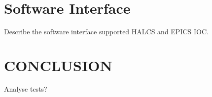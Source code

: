 \documentclass[a4paper,
               biblatex,      %
               ]{jacow}
\begin{document}
\section{Software Interface}
Describe the software interface supported HALCS and EPICS IOC.

\section{CONCLUSION}

Analyse tests?

\newpage
\printbibliography
\end{document}

